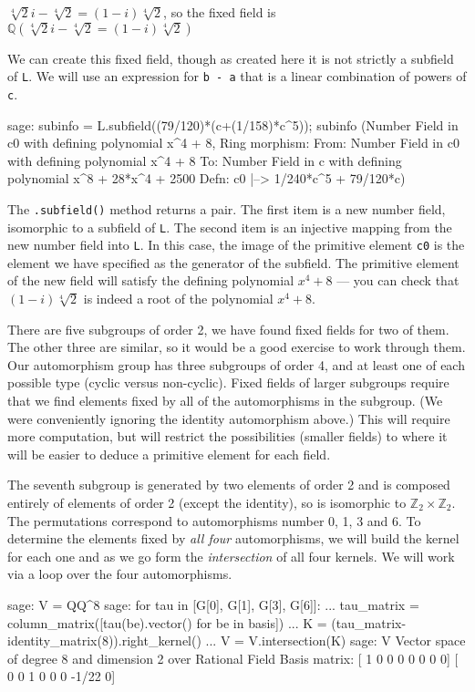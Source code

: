 $\sqrt[4]{2}i - \sqrt[4]{2} = (1-i)\sqrt[4]{2}$, so the fixed field is ${\mathbb Q}(\sqrt[4]{2}i - \sqrt[4]{2} = (1-i)\sqrt[4]{2})$\par
%
We can create this fixed field, though as created here it is not strictly a subfield of \verb?L?.  We will use an expression for \verb?b - a? that is a linear combination of powers of \verb?c?.
%
\begin{sageexample}
sage: subinfo = L.subfield((79/120)*(c+(1/158)*c^5)); subinfo
(Number Field in c0 with defining polynomial x^4 + 8, Ring morphism:
  From: Number Field in c0 with defining polynomial x^4 + 8
  To:   Number Field in c with defining polynomial x^8 + 28*x^4 + 2500
  Defn: c0 |--> 1/240*c^5 + 79/120*c)
\end{sageexample}
%
The \verb?.subfield()? method returns a pair.  The first item is a new number field, isomorphic to a subfield of \verb?L?.  The second item is an injective mapping from the new number field into \verb?L?.  In this case, the image of the primitive element \verb?c0? is the element we have specified as the generator of the subfield.  The primitive element of the new field will satisfy the defining polynomial $x^4+8$ --- you can check that $(1-i)\sqrt[4]{2}$ is indeed a root of the polynomial $x^4 + 8$.\par
%
There are five subgroups of order 2, we have found fixed fields for two of them.  The other three are similar, so it would be a good exercise to work through them.  Our automorphism group has three subgroups of order 4, and at least one of each possible type (cyclic versus non-cyclic).  Fixed fields of larger subgroups require that we find elements fixed by all of the automorphisms in the subgroup.  (We were conveniently ignoring the identity automorphism above.)  This will require more computation, but will restrict the possibilities (smaller fields) to where it will be easier to deduce a primitive element for each field.\par
%
The seventh subgroup is generated by two elements of order 2 and is composed entirely of elements of order 2 (except the identity), so is isomorphic to ${\mathbb Z}_2\times{\mathbb Z}_2$.  The permutations correspond to automorphisms number 0, 1, 3 and 6.  To determine the elements fixed by \emph{all four} automorphisms, we will build the kernel for each one and as we go form the \emph{intersection} of all four kernels.  We will work via a loop over the four automorphisms.
%
\begin{sageexample}
sage: V = QQ^8
sage: for tau in [G[0], G[1], G[3], G[6]]:
...     tau_matrix = column_matrix([tau(be).vector() for be in basis])
...     K = (tau_matrix-identity_matrix(8)).right_kernel()
...     V = V.intersection(K)
sage: V
Vector space of degree 8 and dimension 2 over Rational Field
Basis matrix:
[    1     0     0     0     0     0     0     0]
[    0     0     1     0     0     0 -1/22     0]
\end{sageexample}
